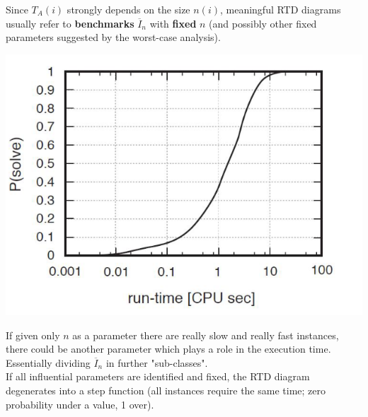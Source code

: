Since $T_A (i )$ strongly depends on the size $n (i )$, meaningful RTD diagrams usually refer to \textbf{benchmarks} $\overline{I}_n$ with \textbf{fixed} $n$ (and possibly other fixed parameters suggested by the worst-case analysis).
\begin{center}
	\includegraphics[width=0.75\columnwidth]{img/RTD1}
\end{center}
If given only $n$ as a parameter there are really slow and really fast instances, there could be another parameter which plays a role in the execution time. Essentially dividing $\overline{I}_n$ in further "sub-classes".\\

If all influential parameters are identified and fixed, the RTD diagram degenerates into a step function (all instances require the same time; zero probability under a value, 1 over).\\

\newpage

